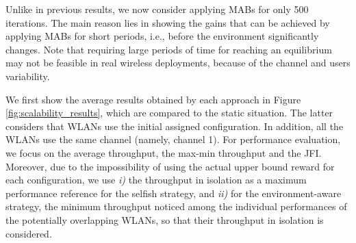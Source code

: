 \documentclass{article}
\begin{document}
Unlike in previous results, we now consider applying MABs for only 500 iterations. The main reason lies in showing the gains that can be achieved by applying MABs for short periods, i.e., before the environment significantly changes. Note that requiring large periods of time for reaching an equilibrium may not be feasible in real wireless deployments, because of the channel and users variability.

We first show the average results obtained by each approach in Figure \ref{fig:scalability_results}, which are compared to the static situation. The latter considers that WLANs use the initial assigned configuration. In addition, all the WLANs use the same channel (namely, channel 1). For performance evaluation, we focus on the average throughput, the max-min throughput and the JFI. Moreover, due to the impossibility of using the actual upper bound reward for each configuration, we use \emph{i)} the throughput in isolation as a maximum performance reference for the selfish strategy, and \emph{ii)} for the environment-aware strategy, the minimum throughput noticed among the individual performances of the potentially overlapping WLANs, so that their throughput in isolation is considered.
\end{document}
